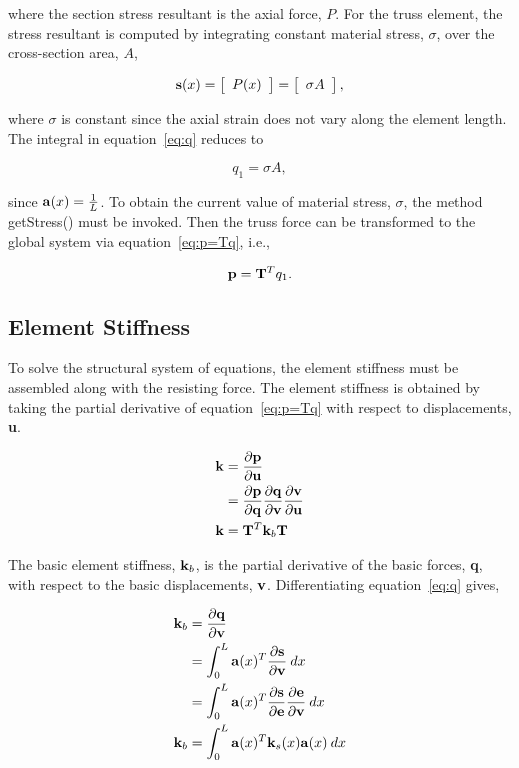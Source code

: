 \documentclass[12pt]{article}
\begin{document}
\noindent where the section stress resultant is the axial force, $P$.
For the truss element, the stress resultant is computed by integrating
constant material stress, $\sigma$, over the cross-section area, $A$,

\begin{equation}
{\bf s}(x) =
\left[ \begin{array}{c} P(x) \end{array} \right] =
\left[ \begin{array}{c} \sigma A \end{array} \right],
\end{equation}

\noindent where $\sigma$ is constant since the axial strain does
not vary along the element length. The integral in equation~\ref{eq:q}
reduces to

\begin{equation}
q_1 = \sigma A,
\end{equation}

\noindent since ${\bf a}(x) = \frac{1}{L}$.
To obtain the current value of material stress, $\sigma$, the method
getStress() must be invoked. Then the truss force can be transformed
to the global system via equation~\ref{eq:p=Tq}, i.e.,

\begin{equation}
{\bf p} = {\bf T}^T q_1.
\end{equation}

\subsection{Element Stiffness}
To solve the structural system of equations, the element stiffness must be assembled
along with the resisting force. The element stiffness is obtained by taking the
partial derivative of equation~\ref{eq:p=Tq} with respect to displacements,
{\bf u}.

\begin{align}
{\bf k} &= \frac{\partial{\bf p}}{\partial{\bf u}}\\
&= \frac{\partial{\bf p}}{\partial{\bf q}} \frac{\partial{\bf q}}{\partial{\bf v}} \frac{\partial{\bf v}}{\partial{\bf u}} \\
{\bf k} &= \label{eq:k} {\bf T}^T {\bf k}_b {\bf T}
\end{align}

\noindent The basic element stiffness, ${\bf k}_b$, is the partial derivative
of the basic forces, {\bf q}, with respect to the basic displacements, ${\bf v}$.
Differentiating equation~\ref{eq:q} gives,

\begin{align}
{\bf k}_b &= \frac{\partial{\bf q}}{\partial{\bf v}} \\
&= \int_0^L {\bf a}(x)^T \frac{\partial{\bf s}}{\partial{\bf v}} \: dx \\
&= \int_0^L {\bf a}(x)^T \frac{\partial{\bf s}}{\partial{\bf e}} \frac{\partial{\bf e}}{\partial{\bf v}} \: dx \\
{\bf k}_b &= \int_0^L {\bf a}(x)^T {\bf k}_s(x) {\bf a}(x) \: dx \\
\end{align}
\end{document}
